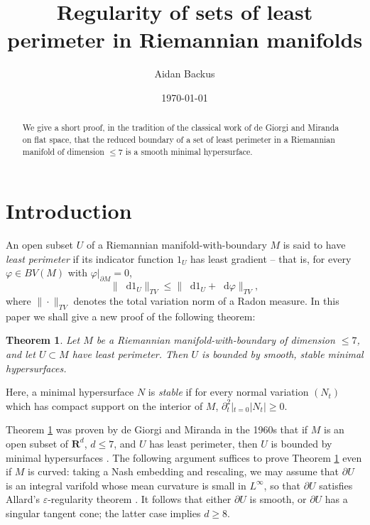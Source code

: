 \documentclass[reqno,11pt]{amsart}
\title{Regularity of sets of least perimeter in Riemannian manifolds}
\author{Aidan Backus}
\date{\today}
\newcommand{\RR}{\mathbf{R}}
\newcommand*\dif{\mathop{}\!\mathrm{d}}
\newcommand{\dfn}[1]{\emph{#1}\index{#1}}
\newtheorem{theorem}{Theorem}[section]
\theoremstyle{definition}
\numberwithin{equation}{section}
\begin{document}
\begin{abstract}
    We give a short proof, in the tradition of the classical work of de Giorgi and Miranda on flat space, that the reduced boundary of a set of least perimeter in a Riemannian manifold of dimension $\leq 7$ is a smooth minimal hypersurface.
\end{abstract}

\maketitle

\section{Introduction}
An open subset $U$ of a Riemannian manifold-with-boundary $M$ is said to have \dfn{least perimeter} if its indicator function $1_U$ has least gradient -- that is, for every $\varphi \in BV(M)$ with $\varphi|_{\partial M} = 0$, 
\begin{equation}\label{least perimeter dfn}
\|\dif 1_U\|_{TV} \leq \|\dif 1_U + \dif \varphi\|_{TV},
\end{equation}
where $\|\cdot\|_{TV}$ denotes the total variation norm of a Radon measure.
In this paper we shall give a new proof of the following theorem:

\begin{theorem}\label{main thm}
Let $M$ be a Riemannian manifold-with-boundary of dimension $\leq 7$, and let $U \subset M$ have least perimeter.
Then $U$ is bounded by smooth, stable minimal hypersurfaces.
\end{theorem}

Here, a minimal hypersurface $N$ is \dfn{stable} if for every normal variation $(N_t)$ which has compact support on the interior of $M$, $\partial_t^2|_{t = 0} |N_t| \geq 0$.

Theorem \ref{main thm} was proven by de Giorgi and Miranda in the 1960s that if $M$ is an open subset of $\RR^d$, $d \leq 7$, and $U$ has least perimeter, then $U$ is bounded by minimal hypersurfaces \cite{deGiorgi61, Miranda66}.
The following argument suffices to prove Theorem \ref{main thm} even if $M$ is curved: taking a Nash embedding and rescaling, we may assume that $\partial U$ is an integral varifold whose mean curvature is small in $L^\infty$, so that $\partial U$ satisfies Allard's $\varepsilon$-regularity theorem \cite{DeLellis18}.
It follows that either $\partial U$ is smooth, or $\partial U$ has a singular tangent cone; the latter case implies $d \geq 8$.
\end{document}

